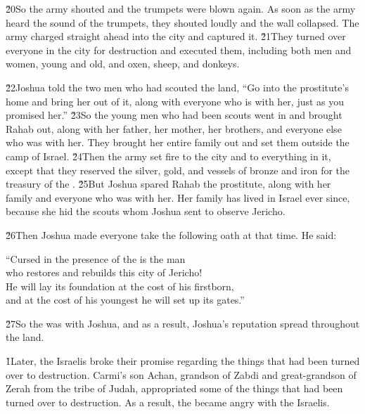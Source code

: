 \v{20}So the army shouted and the trumpets were blown again. As soon as the army heard the sound of the trumpets, they shouted loudly and the wall collapsed. The army charged straight ahead into the city and captured it. \v{21}They turned over everyone in the city for destruction and executed them, including both men and women, young and old, and oxen, sheep, and donkeys.

\v{22}Joshua told the two men who had scouted the land, ``Go into the prostitute's home and bring her out of it, along with everyone who is with her, just as you promised her.'' \v{23}So the young men who had been scouts went in and brought Rahab out, along with her father, her mother, her brothers, and everyone else who was with her. They brought her entire family out and set them outside the camp of Israel. \v{24}Then the army set fire to the city and to everything in it, except that they reserved the silver, gold, and vessels of bronze and iron for the treasury of the . \v{25}But Joshua spared Rahab the prostitute, along with her family and everyone who was with her. Her family has lived in Israel ever since, because she hid the scouts whom Joshua sent to observe Jericho.

\v{26}Then Joshua made everyone take the following oath at that time. He said:

\begin{poetry}
\poeml ``Cursed in the presence of the  is the man \\
\poemll    who restores and rebuilds this city of Jericho! \\
\poeml He will lay its foundation at the cost of his firstborn, \\
\poemll    and at the cost of his youngest he will set up its gates.''
\end{poetry}

\v{27}So the  was with Joshua, and as a result, Joshua's reputation spread throughout the land.

\v{1}Later, the Israelis broke their promise regarding the things that had been turned over to destruction. Carmi's son Achan, grandson of Zabdi and great-grandson of Zerah from the tribe of Judah, appropriated some of the things that had been turned over to destruction. As a result, the  became angry with the Israelis.

